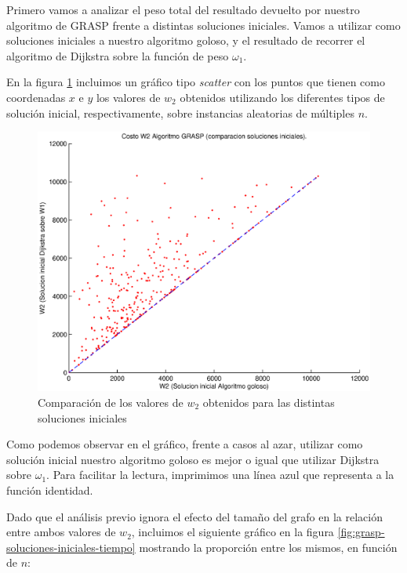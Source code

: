 Primero vamos a analizar el peso total del resultado devuelto por nuestro algoritmo de GRASP frente a distintas soluciones iniciales. Vamos a utilizar como soluciones iniciales a nuestro algoritmo goloso, y el resultado de recorrer el algoritmo de Dijkstra sobre la función de peso $\omega_1$.

En la figura \ref{fig:grasp-soluciones-iniciales} incluimos un gráfico tipo \emph{scatter} con los puntos que tienen como coordenadas $x$ e $y$ los valores de $w_2$ obtenidos utilizando los diferentes tipos de solución inicial, respectivamente, sobre instancias aleatorias de múltiples $n$.

\begin{figure}[H]
  \begin{center}
    \begin{minipage}{0.7\linewidth}
      \includegraphics[width=\linewidth]{graficos/grasp_comparacion_soluciones_iniciales.eps}
      \caption{Comparación de los valores de $w_2$ obtenidos para las distintas soluciones iniciales}\label{fig:grasp-soluciones-iniciales}
    \end{minipage}
  \end{center}
\end{figure}

Como podemos observar en el gráfico, frente a casos al azar, utilizar como solución inicial nuestro algoritmo goloso es mejor o igual que utilizar Dijkstra sobre $\omega_1$. Para facilitar la lectura, imprimimos una línea azul que representa a la función identidad.

Dado que el análisis previo ignora el efecto del tamaño del grafo en la relación entre ambos valores de $w_2$, incluimos el siguiente gráfico en la figura \ref{fig:grasp-soluciones-iniciales-tiempo} mostrando la proporción entre los mismos, en función de $n$:

